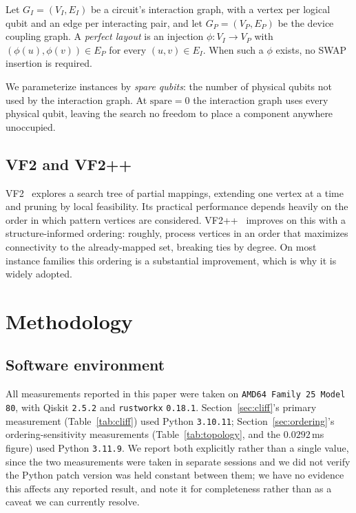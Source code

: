 \documentclass[11pt]{article}
\begin{document}
Let $G_I = (V_I, E_I)$ be a circuit's interaction graph, with a vertex
per logical qubit and an edge per interacting pair, and let
$G_P = (V_P, E_P)$ be the device coupling graph. A \emph{perfect
layout} is an injection $\phi : V_I \to V_P$ with
$(\phi(u), \phi(v)) \in E_P$ for every $(u,v) \in E_I$. When such a
$\phi$ exists, no SWAP insertion is required.

We parameterize instances by \emph{spare qubits}: the number of
physical qubits not used by the interaction graph. At
$\mathrm{spare}=0$ the interaction graph uses every physical qubit,
leaving the search no freedom to place a component anywhere unoccupied.

\subsection{VF2 and VF2++}

VF2~\cite{vf2} explores a search tree of partial mappings, extending
one vertex at a time and pruning by local feasibility. Its practical
performance depends heavily on the order in which pattern vertices are
considered. VF2++~\cite{vf2pp} improves on this with a
structure-informed ordering: roughly, process vertices in an order that
maximizes connectivity to the already-mapped set, breaking ties by
degree. On most instance families this ordering is a substantial
improvement, which is why it is widely adopted.

\section{Methodology}
\label{sec:method}

\subsection{Software environment}

All measurements reported in this paper were taken on
\texttt{AMD64 Family 25 Model 80}, with Qiskit \texttt{2.5.2} and
\texttt{rustworkx} \texttt{0.18.1}. Section~\ref{sec:cliff}'s primary
measurement (Table~\ref{tab:cliff}) used Python \texttt{3.10.11};
Section~\ref{sec:ordering}'s ordering-sensitivity measurements
(Table~\ref{tab:topology}, and the $0.0292$\,ms figure) used Python
\texttt{3.11.9}. We report both explicitly rather than a single value,
since the two measurements were taken in separate sessions and we did
not verify the Python patch version was held constant between them; we
have no evidence this affects any reported result, and note it for
completeness rather than as a caveat we can currently resolve.
\end{document}
